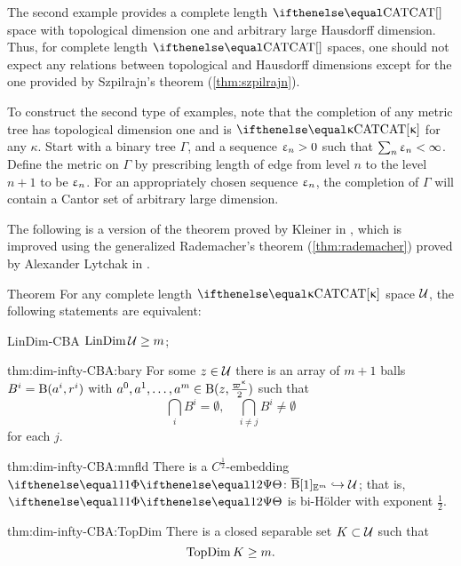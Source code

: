 The second example provides a complete length $\CAT{}$ space 
with topological dimension one and arbitrary large Hausdorff dimension.
Thus, for complete length $\CAT{}$ spaces, one should not expect any relations between topological and Hausdorff dimensions except for the one provided by Szpilrajn's theorem (\ref{thm:szpilrajn}).

To construct the second type of examples,
note that the completion of any metric tree has topological dimension one and is $\CAT\kappa$ for any $\kappa$.
Start with a binary tree $\Gamma$, and a sequence $\upvarepsilon_n>0$ such that $\sum_n\upvarepsilon_n<\infty$.
Define the metric on $\Gamma$
by prescribing length of edge from level $n$ to the level $n+1$ to be  $\upvarepsilon_n$.
For an appropriately chosen sequence $\upvarepsilon_n$, the completion of $\Gamma$ will contain a Cantor set of arbitrary large dimension.

\medskip

The following is a  version of the theorem proved by Kleiner in \cite{kleiner},
which is improved using the generalized Rademacher's theorem (\ref{thm:rademacher}) proved by Alexander Lytchak in \cite{lytchak:diff}.

\begin{thm}{Theorem}\label{thm:dim-infty-CBA}
For any complete length $\CAT\kappa$ space $\mathcal{U}$, the following statements are equivalent:

\begin{subthm}{LinDim-CBA}  $\LinDim\spc{U}\ge m$;
\end{subthm}

\begin{subthm}{thm:dim-infty-CBA:bary} 
For some $z\in \spc{U}$ there is an array of $m+1$ balls $B^i\z=\oBall(a^i,r^i)$ with $a^0,a^1,\dots,a^m\in \oBall(z,\frac{\varpi\kappa}2)$  
such that 
\[\bigcap_i B^i=\emptyset,\quad\bigcap_{i\not=j} B^i\not=\emptyset\]
for each $j$.
\end{subthm}


\begin{subthm}{thm:dim-infty-CBA:mnfld} 
There is a $C^{\frac{1}{2}}$-embedding $\map\:\cBall[1]_{\EE^m}\hookrightarrow \spc{U}$;
that is, $\map$ is bi-H\"older with exponent $\tfrac{1}{2}$.
\end{subthm}

\begin{subthm}{thm:dim-infty-CBA:TopDim}
There is a closed separable set $K\subset\spc{U}$ such that 
\[\TopDim K\ge m.\]
\end{subthm}

\end{thm}

